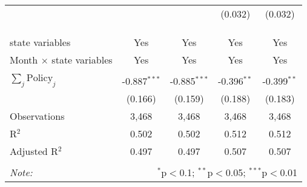 \begin{tabular}{@{\extracolsep{1pt}}lcccc}
  &  &  & (0.032) & (0.032) \\ 
   &  &  &  &  \\ 
  &  &  &  &  \\ 
 \hline \\[-1.8ex] 
state variables & Yes & Yes & Yes & Yes \\ 
Month $\times$ state variables & Yes & Yes & Yes & Yes \\ 
\hline \\[-1.8ex] 
$\sum_j \mathrm{Policy}_j$ & -0.887$^{***}$ & -0.885$^{***}$ & -0.396$^{**}$ & -0.399$^{**}$ \\ 
 & (0.166) & (0.159) & (0.188) & (0.183) \\ 
Observations & 3,468 & 3,468 & 3,468 & 3,468 \\ 
R$^{2}$ & 0.502 & 0.502 & 0.512 & 0.512 \\ 
Adjusted R$^{2}$ & 0.497 & 0.497 & 0.507 & 0.507 \\ 
\hline 
\hline \\[-1.8ex] 
\textit{Note:}  & \multicolumn{4}{r}{$^{*}$p$<$0.1; $^{**}$p$<$0.05; $^{***}$p$<$0.01} \\ 
\end{tabular} 
